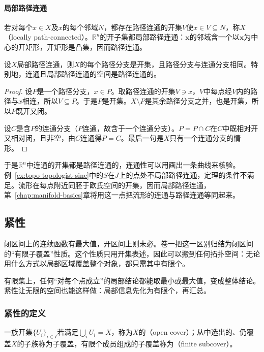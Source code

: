 \paragraph{局部路径连通}
若对每个$x\in X$及$x$的每个邻域$N$，都存在路径连通的开集$V$使$x\in V\subseteq N$，称$X$（locally path-connected）。$\mathbb R^n$的开子集都局部路径连通：$\bm x$的邻域含一个以$\bm x$为中心的开矩形，开矩形是凸集，因而路径连通。

\begin{theorem}[局部路径连通时两种分支一致]
\label{thm:topo-locally-path-connected}
设$X$局部路径连通，则$X$的每个路径分支是开集，且路径分支与连通分支相同。特别地，连通且局部路径连通的空间是路径连通的。
\end{theorem}
\begin{proof}
设$P$是一个路径分支，$x\in P$。取路径连通的开集$V\ni x$，$V$中每点经$V$内的路径与$x$相连，所以$V\subseteq P$。于是$P$是开集。$X\setminus P$是其余路径分支之并，也是开集，所以$P$既开又闭。

设$C$是含$P$的连通分支（$P$连通，故含于一个连通分支）。$P=P\cap C$在$C$中既相对开又相对闭，且非空，由$C$连通得$P=C$。最后一句是$X$只有一个连通分支的情形。
\end{proof}

于是$\mathbb R^n$中连通的开集都是路径连通的，连通性可以用画出一条曲线来核验。例~\ref{ex:topo-topologist-sine}中的$S$在$J$上的点处不局部路径连通，定理的条件不满足。流形在每点附近同胚于欧氏空间的开集，因而局部路径连通，第~\ref{chap:manifold-basics}章将用这一点把流形的连通与路径连通等同起来。

\subsection{紧性}
\label{sec:topo-compactness}

闭区间上的连续函数有最大值，开区间上则未必。卷一把这一区别归结为闭区间的“有限子覆盖”性质。这个性质只用开集表述，因此可以搬到任何拓扑空间：无论用什么方式以局部区域覆盖整个对象，都只需其中有限个。

有限集上，任何“对每个点成立”的局部结论都能取最小或最大值，变成整体结论。紧性让无限的空间也能这样做：局部信息先化为有限个，再汇总。

\subsubsection{紧性的定义}
\label{sec:topo-compact-definition}

一族开集$\{U_i\}_{i\in I}$若满足$\bigcup_iU_i=X$，称为$X$的（open cover）；从中选出的、仍覆盖$X$的子族称为子覆盖，有限个成员组成的子覆盖称为（finite subcover）。

